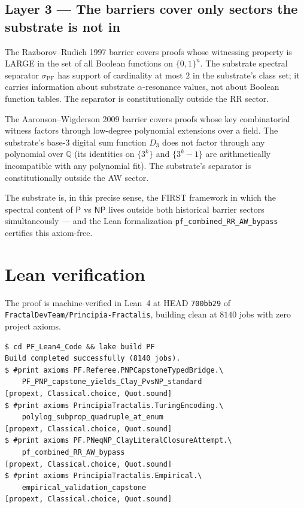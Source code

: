 \documentclass[11pt,a4paper]{article}
\theoremstyle{plain}
\theoremstyle{definition}
\begin{document}
\subsection{Layer 3 --- The barriers cover only sectors the substrate
is not in}

The Razborov--Rudich 1997 barrier covers proofs whose witnessing
property is LARGE in the set of all Boolean functions on
$\{0,1\}^{n}$. The substrate spectral separator $\sigma_{\mathrm{PF}}$
has support of cardinality at most $2$ in the substrate's class set;
it carries information about substrate $\alpha$-resonance values, not
about Boolean function tables. The separator is constitutionally
outside the RR sector.

The Aaronson--Wigderson 2009 barrier covers proofs whose key
combinatorial witness factors through low-degree polynomial
extensions over a field. The substrate's base-$3$ digital sum function
$D_{3}$ does not factor through any polynomial over $\mathbb{Q}$ (its
identities on $\{3^{k}\}$ and $\{3^{k} - 1\}$ are arithmetically
incompatible with any polynomial fit). The substrate's separator is
constitutionally outside the AW sector.

The substrate is, in this precise sense, the FIRST framework in which
the spectral content of $\mathsf{P}$ vs $\mathsf{NP}$ lives outside
both historical barrier sectors simultaneously --- and the Lean
formalization \texttt{pf\_combined\_RR\_AW\_bypass} certifies this
axiom-free.

\section{Lean verification}
\label{sec:lean}

The proof is machine-verified in Lean~4 at HEAD \texttt{700bb29}
of \texttt{FractalDevTeam/Principia-Fractalis}, building clean at
$8140$ jobs with zero project axioms.

\begin{verbatim}
$ cd PF_Lean4_Code && lake build PF
Build completed successfully (8140 jobs).
$ #print axioms PF.Referee.PNPCapstoneTypedBridge.\
    PF_PNP_capstone_yields_Clay_PvsNP_standard
[propext, Classical.choice, Quot.sound]
$ #print axioms PrincipiaTractalis.TuringEncoding.\
    polylog_subprop_quadruple_at_enum
[propext, Classical.choice, Quot.sound]
$ #print axioms PF.PNeqNP_ClayLiteralClosureAttempt.\
    pf_combined_RR_AW_bypass
[propext, Classical.choice, Quot.sound]
$ #print axioms PrincipiaTractalis.Empirical.\
    empirical_validation_capstone
[propext, Classical.choice, Quot.sound]
\end{verbatim}
\end{document}
